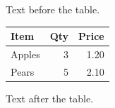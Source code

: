 \documentclass[12pt]{article}
\begin{document}
Text before the table.

\begin{tabular}{lrr}\toprule\rowcolor{gray!15} Item & Qty & Price\\\midrule Apples & 3 & 1.20\\\rowcolor{gray!15} Pears & 5 & 2.10\\\bottomrule\end{tabular}

Text after the table.
\end{document}
